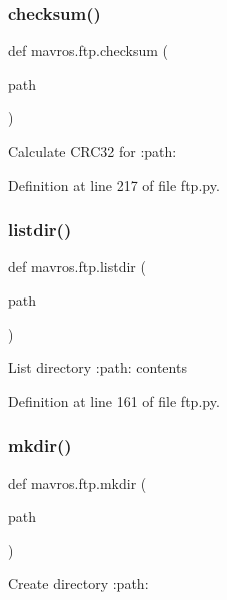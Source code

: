 \subsubsection{\texorpdfstring{checksum()}{checksum()}}
{\footnotesize\ttfamily def mavros.\+ftp.\+checksum (\begin{DoxyParamCaption}\item[{}]{path }\end{DoxyParamCaption})}

\begin{DoxyVerb}Calculate CRC32 for :path:\end{DoxyVerb}
 

Definition at line 217 of file ftp.\+py.

\mbox{\label{namespacemavros_1_1ftp_a34a55112263ee6c5e8018c45dc04c1d0}} 
\subsubsection{\texorpdfstring{listdir()}{listdir()}}
{\footnotesize\ttfamily def mavros.\+ftp.\+listdir (\begin{DoxyParamCaption}\item[{}]{path }\end{DoxyParamCaption})}

\begin{DoxyVerb}List directory :path: contents\end{DoxyVerb}
 

Definition at line 161 of file ftp.\+py.

\mbox{\label{namespacemavros_1_1ftp_a45085a8fdfe2bb00fc86f59e8cce62e6}} 
\subsubsection{\texorpdfstring{mkdir()}{mkdir()}}
{\footnotesize\ttfamily def mavros.\+ftp.\+mkdir (\begin{DoxyParamCaption}\item[{}]{path }\end{DoxyParamCaption})}

\begin{DoxyVerb}Create directory :path:\end{DoxyVerb}
 

